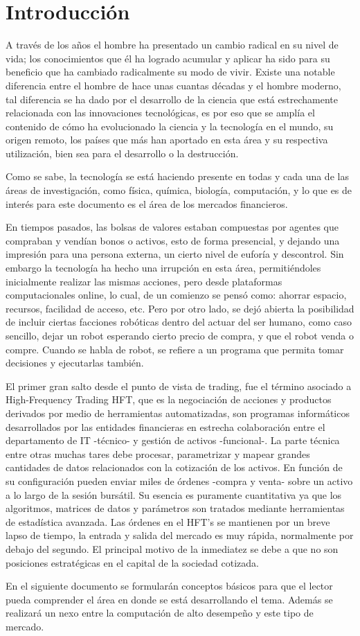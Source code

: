 \section{Introducción}
A través de los años el hombre ha presentado un cambio radical en su nivel de vida; los conocimientos que él ha logrado acumular y aplicar ha sido para su beneficio 
que ha cambiado radicalmente su modo de vivir. Existe una notable diferencia entre el hombre de hace unas cuantas décadas y el hombre moderno, tal diferencia se ha 
dado por el desarrollo de la ciencia que está estrechamente relacionada con las innovaciones tecnológicas, es por eso que se amplía el contenido de cómo ha 
evolucionado la ciencia y la tecnología en el mundo, su origen remoto, los países que más han aportado en esta área y su respectiva utilización, bien sea para 
el desarrollo o la destrucción.

Como se sabe, la tecnología se está haciendo presente en todas y cada una de las áreas de investigación, como física, química, biología, computación, y lo que es de 
interés para este documento es el área de los mercados financieros.

En tiempos pasados, las bolsas de valores estaban compuestas por agentes que compraban y vendían bonos o activos, esto de forma presencial, y dejando una impresión 
para una persona externa, un cierto nivel de euforía y descontrol. Sin embargo la tecnología ha hecho una irrupción en esta área, permitiéndoles inicialmente
realizar las mismas acciones, pero desde plataformas computacionales online, lo cual, de un comienzo se pensó como: ahorrar espacio, recursos, facilidad de acceso, etc.
Pero por otro lado, se dejó abierta la posibilidad de incluir ciertas facciones robóticas dentro del actuar del ser humano, como caso sencillo, dejar un robot esperando
cierto precio de compra, y que el robot venda o compre. Cuando se habla de robot, se refiere a un programa que permita tomar decisiones y ejecutarlas también.

El primer gran salto desde el punto de vista de trading, fue el término asociado a High-Frequency Trading HFT, que es la negociación de acciones y productos derivados 
por medio de herramientas automatizadas, son programas informáticos desarrollados por las entidades financieras en estrecha colaboración entre el departamento de 
IT -técnico- y gestión de activos -funcional-.  La parte técnica entre otras muchas tares debe procesar, parametrizar y mapear grandes cantidades de datos 
relacionados con la cotización de los activos. En función de su configuración pueden enviar miles de órdenes -compra y venta- sobre un activo a lo largo de la sesión 
bursátil. Su esencia es puramente cuantitativa ya que los algoritmos, matrices de datos y parámetros son tratados mediante herramientas de estadística avanzada.  
Las órdenes en el HFT's se mantienen por un breve lapso de tiempo, la entrada y salida del mercado es muy rápida, normalmente por debajo del segundo. El principal 
motivo de la inmediatez se debe a que no son posiciones estratégicas en el capital de la sociedad cotizada.

En el siguiente documento se formularán conceptos básicos para que el lector pueda comprender el área en donde se está desarrollando el tema. Además se realizará
un nexo entre la computación de alto desempeño y este tipo de mercado.
